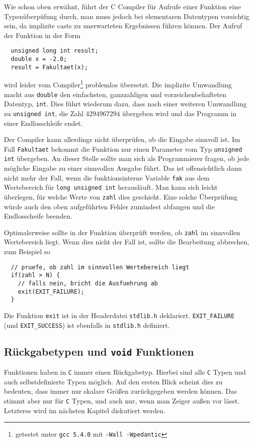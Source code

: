 Wie schon oben erwähnt, führt der C Compiler für Aufrufe einer Funktion eine Typenüberpüfung durch, man muss jedoch bei elementaren Datentypen vorsichtig sein, da implizite casts zu unerwarteten Ergebnissen führen können.
Der Aufruf der Funktion in der Form
\begin{lstlisting}
  unsigned long int result;
  double x = -2.0;
  result = Fakultaet(x);
\end{lstlisting}
wird leider vom Compiler\footnote{getestet unter \texttt{gcc 5.4.0} mit \texttt{-Wall -Wpedantic}} problemlos übersetzt.
Die implizite Umwandlung macht aus \texttt{double} den einfachsten, ganzzahligen und vorzeichenbehafteten Datentyp, \texttt{int}.
Dies führt wiederum dazu, dass nach einer weiteren Umwandlung zu \texttt{unsigned int}, die Zahl $4294967294$ übergeben wird und das Programm in einer Endlosschleife endet.

Der Compiler kann allerdings nicht überprüfen, ob die Eingabe sinnvoll ist.
Im Fall \verb|Fakultaet| bekommt die Funktion nur einen Parameter vom Typ \verb|unsigned int| übergeben. 
An dieser Stelle sollte man sich als Programmierer fragen, ob jede mögliche Eingabe zu einer sinnvollen Ausgabe führt. 
Das ist offensichtlich dann nicht mehr der Fall, wenn die funktionsinterne Variable \verb|fak| aus dem Wertebereich für \verb|long unsigned int| herausläuft. 
Man kann sich leicht überlegen, für welche Werte von \verb|zahl| dies geschieht.
Eine solche Überprüfung würde auch den oben aufgeführten Fehler zumindest abfangen und die Endlosscheife beenden.

Optimalerweise sollte in der Funktion überprüft werden, ob \verb|zahl| im sinnvollen Wertebereich liegt. 
Wenn dies nicht der Fall ist, sollte die Bearbeitung abbrechen, zum Beispiel so
\begin{lstlisting}
  // pruefe, ob zahl im sinnvollen Wertebereich liegt
  if(zahl > N) {
    // falls nein, bricht die Ausfuehrung ab
    exit(EXIT_FAILURE);
  }
\end{lstlisting}
Die Funktion \verb|exit| ist in der Headerdatei \verb|stdlib.h| deklariert.
\verb|EXIT_FAILURE| (und \verb|EXIT_SUCCESS|) ist ebenfalls in \verb|stdlib.h| definiert.

\subsection{Rückgabetypen und \texttt{void} Funktionen}

Funktionen haben in \texttt{C} immer einen Rückgabetyp.
Hierbei sind alle \texttt{C} Typen und auch selbstdefinierte Typen möglich.
Auf den ersten Blick scheint dies zu bedeuten, dass immer nur skalare Größen zurückgegeben werden können.
Das stimmt aber nur für \texttt{C} Typen, und auch nur, wenn man Zeiger außen vor lässt.
Letzteres wird im nächsten Kapitel diskutiert werden.


